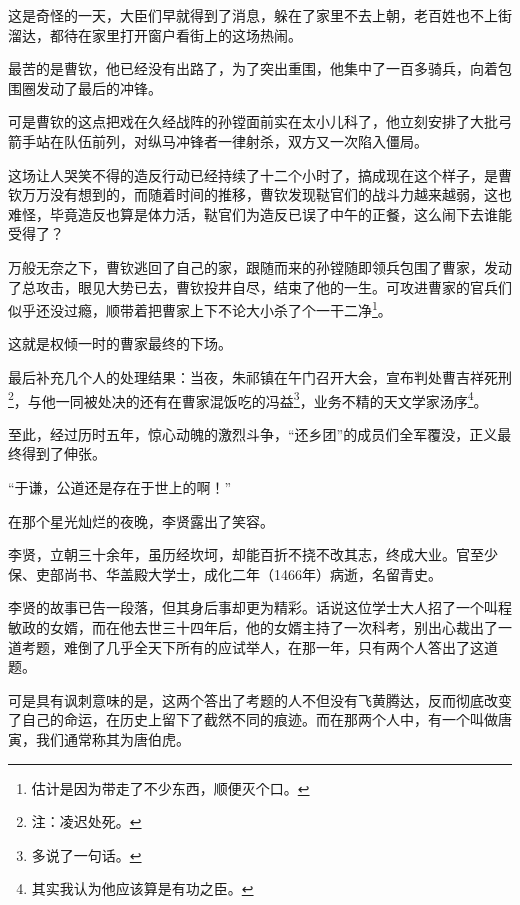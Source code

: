\begin{multicols}{\theparacolNo}
		这是奇怪的一天，大臣们早就得到了消息，躲在了家里不去上朝，老百姓也不上街溜达，都待在家里打开窗户看街上的这场热闹。

		最苦的是曹钦，他已经没有出路了，为了突出重围，他集中了一百多骑兵，向着包围圈发动了最后的冲锋。

		可是曹钦的这点把戏在久经战阵的孙镗面前实在太小儿科了，他立刻安排了大批弓箭手站在队伍前列，对纵马冲锋者一律射杀，双方又一次陷入僵局。

		这场让人哭笑不得的造反行动已经持续了十二个小时了，搞成现在这个样子，是曹钦万万没有想到的，而随着时间的推移，曹钦发现鞑官们的战斗力越来越弱，这也难怪，毕竟造反也算是体力活，鞑官们为造反已误了中午的正餐，这么闹下去谁能受得了？

		万般无奈之下，曹钦逃回了自己的家，跟随而来的孙镗随即领兵包围了曹家，发动了总攻击，眼见大势已去，曹钦投井自尽，结束了他的一生。可攻进曹家的官兵们似乎还没过瘾，顺带着把曹家上下不论大小杀了个一干二净\footnote{估计是因为带走了不少东西，顺便灭个口。}。

		这就是权倾一时的曹家最终的下场。

		最后补充几个人的处理结果：当夜，朱祁镇在午门召开大会，宣布判处曹吉祥死刑\footnote{注：凌迟处死。}，与他一同被处决的还有在曹家混饭吃的冯益\footnote{多说了一句话。}，业务不精的天文学家汤序\footnote{其实我认为他应该算是有功之臣。}。

		至此，经过历时五年，惊心动魄的激烈斗争，“还乡团”的成员们全军覆没，正义最终得到了伸张。

		“于谦，公道还是存在于世上的啊！”

		在那个星光灿烂的夜晚，李贤露出了笑容。

		李贤，立朝三十余年，虽历经坎坷，却能百折不挠不改其志，终成大业。官至少保、吏部尚书、华盖殿大学士，成化二年（1466年）病逝，名留青史。
		\begin{quote}
			\begin{spacing}{0.5}  %
				\textit{{\footnotesize
							\begin{description}
								\item[\textcolor{Gray}{\faQuoteRight}] 史赞：伟哉！宰相才也！
							\end{description}
						}}
			\end{spacing}
		\end{quote}

		李贤的故事已告一段落，但其身后事却更为精彩。话说这位学士大人招了一个叫程敏政的女婿，而在他去世三十四年后，他的女婿主持了一次科考，别出心裁出了一道考题，难倒了几乎全天下所有的应试举人，在那一年，只有两个人答出了这道题。

		可是具有讽刺意味的是，这两个答出了考题的人不但没有飞黄腾达，反而彻底改变了自己的命运，在历史上留下了截然不同的痕迹。而在那两个人中，有一个叫做唐寅，我们通常称其为唐伯虎。
		\ifnum{}
	\end{multicols}
\fi
\newpage
